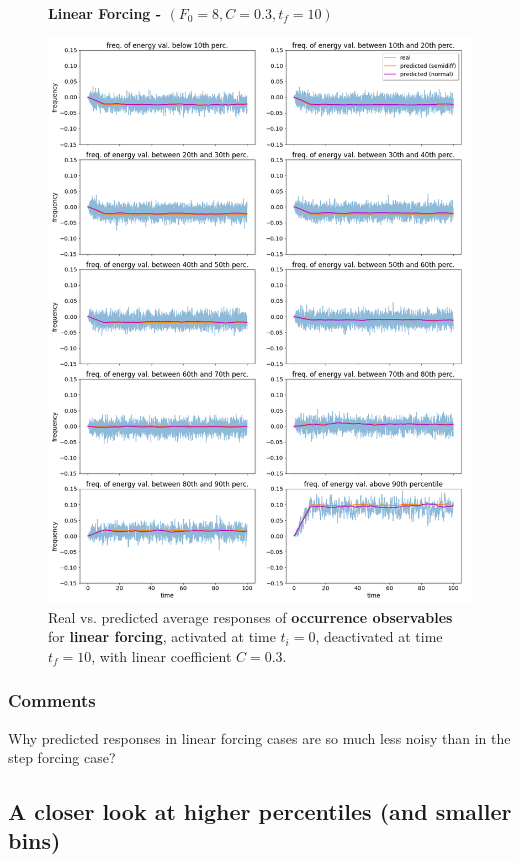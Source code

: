 \documentclass{article}
\begin{document}
\begin{figure}[!h]
	\centering
	\textbf{Linear Forcing - $(F_0=8, C=0.3, t_f=10)$}\par\medskip
	\includegraphics[width=0.9\linewidth]{fig/pred_bin_L_03_10.png}
	\caption{Real vs. predicted average responses of \textbf{occurrence observables} for \textbf{linear forcing}, activated at time $t_i=0$, deactivated at time $t_f=10$, with linear coefficient $C=0.3$.}
	\label{fig:pred_bin_L_03_10}
\end{figure}

\subsubsection{Comments}

Why predicted responses in linear forcing cases are so much less noisy than in the step forcing case?

\newpage

\subsection{A closer look at higher percentiles (and smaller bins)}
\end{document}
